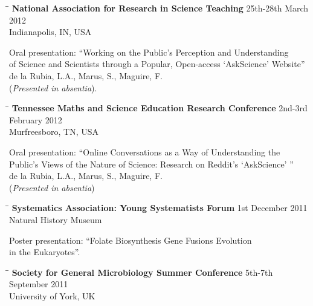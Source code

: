 \documentclass{res}
\begin{document}
\begin{resume}
   \begin{tabbing}
   \hspace{2in}\= \hspace{2.6in}\= \kill 
   {\bf National Association for Research in Science Teaching } \>  \> 25th-28th March 2012\\
                        \>     \> Indianapolis, IN, USA
   \end{tabbing}\vspace{-20pt}      
Oral presentation: ``Working on the Public's Perception and Understanding \\of Science and Scientists
through a Popular, Open-access `AskScience' Website'' \\
de la Rubia, L.A., Marus, S., Maguire, F. \\
(\emph{Presented in absentia}).
   
   
   \vspace{-0.1in}
    \begin{tabbing}
   \hspace{2in}\= \hspace{2.6in}\= \kill 
    {\bf Tennessee Maths and Science Education Research Conference} \>  \> 2nd-3rd February 2012\\
                        \>     \> Murfreesboro, TN, USA
   \end{tabbing}
   
  \vspace{-30pt}     
Oral presentation: ``Online Conversations as a Way of Understanding the \\Public's Views of the Nature of Science: Research on Reddit's `AskScience' '' 
 \\ de la Rubia, L.A., Marus, S., Maguire, F. \\
 (\emph{Presented in absentia})
  \vspace{-0.1in}
  
  \begin{tabbing}
   \hspace{2in}\= \hspace{2.6in}\= \kill 
    {\bf Systematics Association: Young Systematists Forum} \>  \> 1st December 2011\\
                        \>     \> Natural History Museum
   \end{tabbing}\vspace{-20pt}      
   
   Poster presentation: ``Folate Biosynthesis Gene Fusions Evolution \\in the Eukaryotes''.
    \vspace{-0.1in}  
    \begin{tabbing}
   \hspace{2in}\= \hspace{2.6in}\= \kill 
    {\bf Society for General Microbiology Summer Conference} \> \>5th-7th September 2011\\
                          \>   \> University of York, UK


\end{tabbing}
\end{resume}
\end{document}
